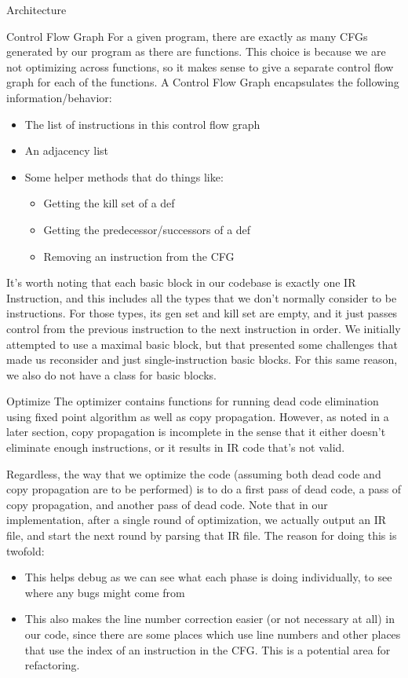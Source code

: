 \documentclass[letterpaper,12pt]{article}
\theoremstyle{definition}
\begin{document}
\begin{section}{Architecture}
		\begin{subsection}{Control Flow Graph}
			For a given program, there are exactly as many CFGs generated by our program as there are functions. This choice is because we are not optimizing across functions, so it makes sense to give a separate control flow graph for each of the functions. A Control Flow Graph encapsulates the following information/behavior:
			\begin{itemize}
				\item The list of instructions in this control flow graph
				\item An adjacency list
				\item Some helper methods that do things like:
					\begin{itemize}
						\item Getting the kill set of a def
						\item Getting the predecessor/successors of a def
						\item Removing an instruction from the CFG
					\end{itemize}
			\end{itemize}
			It's worth noting that each basic block in our codebase is exactly one IR Instruction, and this includes all the types that we don't normally consider to be instructions. For those types, its gen set and kill set are empty, and it just passes control from the previous instruction to the next instruction in order. We initially attempted to use a maximal basic block, but that presented some challenges that made us reconsider and just single-instruction basic blocks. For this same reason, we also do not have a class for basic blocks.
		\end{subsection}

		\begin{subsection}{Optimize}
			The optimizer contains functions for running dead code elimination using fixed point algorithm as well as copy propagation. However, as noted in a later section, copy propagation is incomplete in the sense that it either doesn't eliminate enough instructions, or it results in IR code that's not valid.

			Regardless, the way that we optimize the code (assuming both dead code and copy propagation are to be performed) is to do a first pass of dead code, a pass of copy propagation, and another pass of dead code. Note that in our implementation, after a single round of optimization, we actually output an IR file, and start the next round by parsing that IR file. The reason for doing this is twofold:
			\begin{itemize}
				\item This helps debug as we can see what each phase is doing individually, to see where any bugs might come from
				\item This also makes the line number correction easier (or not necessary at all) in our code, since there are some places which use line numbers and other places that use the index of an instruction in the CFG. This is a potential area for refactoring.
			\end{itemize}
		\end{subsection}
	\end{section}
\end{document}
